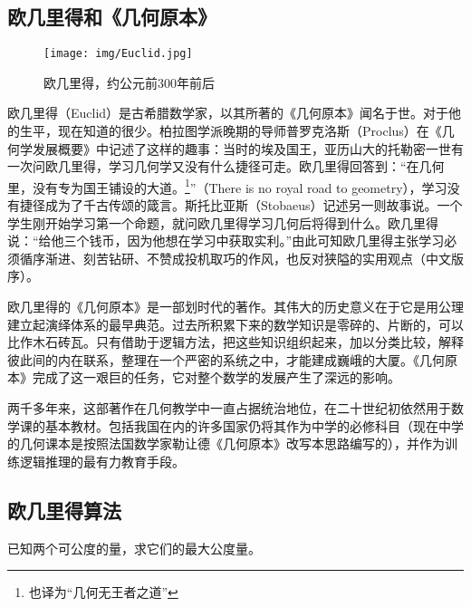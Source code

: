 \documentclass[b5paper]{ctexart}
\begin{document}
\subsection{欧几里得和《几何原本》}

\begin{wrapfigure}{R}{0.4\textwidth}
 \centering
 \texttt{[image: img/Euclid.jpg]}
 \caption{欧几里得，约公元前300年前后}
 \label{fig:Euclid}
\end{wrapfigure}

欧几里得（Euclid）是古希腊数学家，以其所著的《几何原本》闻名于世。对于他的生平，现在知道的很少。柏拉图学派晚期的导师普罗克洛斯（Proclus）在《几何学发展概要》中记述了这样的趣事：当时的埃及国王，亚历山大的托勒密一世有一次问欧几里得，学习几何学又没有什么捷径可走。欧几里得回答到：“在几何里，没有专为国王铺设的大道。\footnote{也译为“几何无王者之道”}”（There is no royal road to geometry），学习没有捷径成为了千古传颂的箴言。斯托比亚斯（Stobaeus）记述另一则故事说。一个学生刚开始学习第一个命题，就问欧几里得学习几何后将得到什么。欧几里得说：“给他三个钱币，因为他想在学习中获取实利。”由此可知欧几里得主张学习必须循序渐进、刻苦钻研、不赞成投机取巧的作风，也反对狭隘的实用观点（\cite{Elements}中文版序）。

欧几里得的《几何原本》是一部划时代的著作。其伟大的历史意义在于它是用公理建立起演绎体系的最早典范。过去所积累下来的数学知识是零碎的、片断的，可以比作木石砖瓦。只有借助于逻辑方法，把这些知识组织起来，加以分类比较，解释彼此间的内在联系，整理在一个严密的系统之中，才能建成巍峨的大厦。《几何原本》完成了这一艰巨的任务，它对整个数学的发展产生了深远的影响。

两千多年来，这部著作在几何教学中一直占据统治地位，在二十世纪初依然用于数学课的基本教材。包括我国在内的许多国家仍将其作为中学的必修科目（现在中学的几何课本是按照法国数学家勒让德《几何原本》改写本思路编写的），并作为训练逻辑推理的最有力教育手段\cite{HanXueTao16}。

\subsection{欧几里得算法}

\begin{proposition}
已知两个可公度的量，求它们的最大公度量。
\end{proposition}
\end{document}
